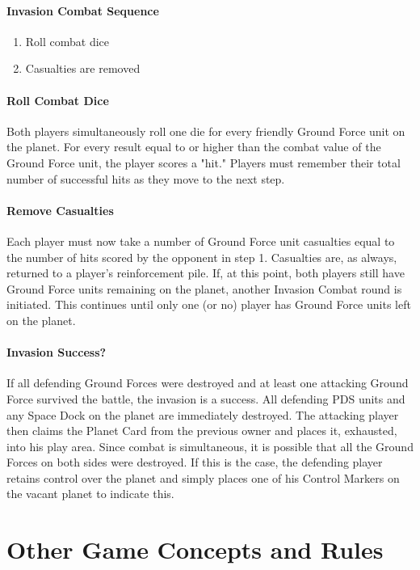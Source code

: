 \documentclass[11pt,fleqn]{book} %
\begin{document}
\subsubsection{Invasion Combat Sequence}
\begin{enumerate}[]
\item Roll combat dice
\item Casualties are removed
\end{enumerate}

\subsubsection{Roll Combat Dice}
Both players simultaneously roll one die for every friendly Ground Force unit on the planet. For every result equal to or higher than the combat value of the Ground Force unit, the player scores a "hit." Players must remember their total number of successful hits as they move to the next step.

\subsubsection{Remove Casualties}
Each player must now take a number of Ground Force unit casualties equal to the number of hits scored by the opponent in step 1. Casualties are, as always, returned to a player's reinforcement pile.
If, at this point, both players still have Ground Force units remaining on the planet, another Invasion Combat round is initiated. This continues until only one (or no) player has Ground Force units left on the planet.

\subsubsection{Invasion Success?}
If all defending Ground Forces were destroyed and at least one attacking Ground Force survived the battle, the invasion is a success. All defending PDS units and any Space Dock on the planet are immediately destroyed. The attacking player then claims the Planet Card from the previous owner and places it, exhausted, into his play area. Since combat is simultaneous, it is possible that all the Ground Forces on both sides were destroyed. If this is the case, the defending player retains control over the planet and simply places one of his Control Markers on the vacant planet to indicate this.


\chapter{Other Game Concepts and Rules}
\end{document}
